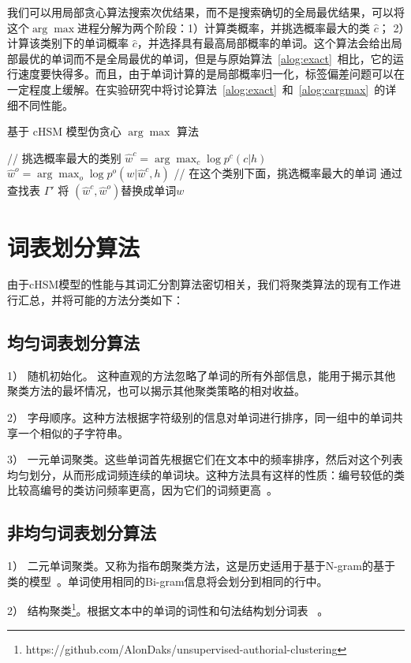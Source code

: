 我们可以用局部贪心算法搜索次优结果，而不是搜索确切的全局最优结果，可以将这个$\arg\max$进程分解为两个阶段：1）计算类概率，并挑选概率最大的类 $\hat c $； 2）计算该类别下的单词概率 $\hat c$，并选择具有最高局部概率的单词。这个算法会给出局部最优的单词而不是全局最优的单词，但是与原始算法~\ref{alog:exact}~相比，它的运行速度要快得多。而且，由于单词计算的是局部概率归一化，标签偏差问题可以在一定程度上缓解。在实验研究中将讨论算法~\ref{alog:exact}~和~\ref{alog:cargmax}~的详细不同性能。
\begin{algorithm}[!t]
 \caption{基于 cHSM 模型伪贪心 $\arg\max$ 算法}\label{alog:cargmax}
{// 挑选概率最大的类别}\;
 {$\hat w^c=\arg\max_c{\log p^c(c|h)}$ }\;
 {$\hat w^o=\arg\max_o{\log p^o(w|\hat w^c,h)}$}\;
 {// 在这个类别下面，挑选概率最大的单词}\;
 {通过查找表 $\Gamma'$ 将 $(\hat w^c,\hat w^o)$替换成单词$w$}\;
\end{algorithm}

\section{词表划分算法}
由于cHSM模型的性能与其词汇分割算法密切相关，我们将聚类算法的现有工作进行汇总，并将可能的方法分类如下：

\subsection{均匀词表划分算法}
1） 随机初始化。 这种直观的方法忽略了单词的所有外部信息，能用于揭示其他聚类方法的最坏情况，也可以揭示其他聚类策略的相对收益。

2） 字母顺序。这种方法根据字符级别的信息对单词进行排序，同一组中的单词共享一个相似的子字符串。


3） 一元单词聚类。这些单词首先根据它们在文本中的频率排序，然后对这个列表均匀划分，从而形成词频连续的单词块。这种方法具有这样的性质：编号较低的类比较高编号的类访问频率更高，因为它们的词频更高~。



\subsection{非均匀词表划分算法}
1） 二元单词聚类。又称为指布朗聚类方法，这是历史适用于基于N-gram的基于类的模型~。单词使用相同的Bi-gram信息将会划分到相同的行中。

2） 结构聚类\footnote{https://github.com/AlonDaks/unsupervised-authorial-clustering}。根据文本中的单词的词性和句法结构划分词表~ 。

